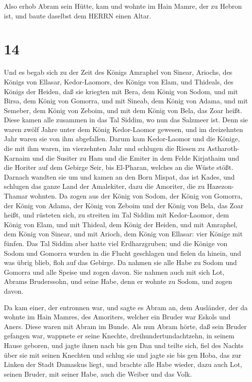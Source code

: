  Also erhob Abram sein Hütte, kam und wohnte im Hain Mamre,
der zu Hebron ist, und baute daselbst dem HERRN einen Altar.

\hypertarget{section-13}{%
\section{14}\label{section-13}}

 Und es begab sich zu der Zeit des Königs Amraphel von
Sinear, Ariochs, des Königs von Ellasar, Kedor-Laomors, des Königs von
Elam, und Thideals, des Königs der Heiden,  daß sie kriegten
mit Bera, dem König von Sodom, und mit Birsa, dem König von Gomorra, und
mit Sineab, dem König von Adama, und mit Semeber, dem König von Zeboim,
und mit dem König von Bela, das Zoar heißt.  Diese kamen
alle zusammen in das Tal Siddim, wo nun das Salzmeer ist. 
Denn sie waren zwölf Jahre unter dem König Kedor-Laomor gewesen, und im
dreizehnten Jahr waren sie von ihm abgefallen.  Darum kam
Kedor-Laomor und die Könige, die mit ihm waren, im vierzehnten Jahr und
schlugen die Riesen zu Astharoth-Karnaim und die Susiter zu Ham und die
Emiter in dem Felde Kirjathaim  und die Horiter auf dem
Gebirge Seir, bis El-Pharan, welches an die Wüste stößt. 
Darnach wandten sie um und kamen an den Born Mispat, das ist Kades, und
schlugen das ganze Land der Amalekiter, dazu die Amoriter, die zu
Hazezon-Thamar wohnten.  Da zogen aus der König von Sodom,
der König von Gomorra, der König von Adama, der König von Zeboim und der
König von Bela, das Zoar heißt, und rüsteten sich, zu streiten im Tal
Siddim  mit Kedor-Laomor, dem König von Elam, und mit
Thideal, dem König der Heiden, und mit Amraphel, dem König von Sinear,
und mit Arioch, dem König von Ellasar: vier Könige mit fünfen.
 Das Tal Siddim aber hatte viel Erdharzgruben; und die
Könige von Sodom und Gomorra wurden in die Flucht geschlagen und fielen
da hinein, und was übrig blieb, floh auf das Gebirge.  Da
nahmen sie alle Habe zu Sodom und Gomorra und alle Speise und zogen
davon.  Sie nahmen auch mit sich Lot, Abrams Bruderssohn,
und seine Habe, denn er wohnte zu Sodom, und zogen davon.

 Da kam einer, der entronnen war, und sagte es Abram an,
dem Ausländer, der da wohnte im Hain Mamres, des Amoriters, welcher ein
Bruder war Eskols und Aners. Diese waren mit Abram im Bunde.
 Als nun Abram hörte, daß sein Bruder gefangen war,
wappnete er seine Knechte, dreihundertundachtzehn, in seinem Hause
geboren, und jagte ihnen nach bis gen Dan  und teilte sich,
fiel des Nachts über sie mit seinen Knechten und schlug sie und jagte
sie bis gen Hoba, das zur Linken der Stadt Damaskus liegt, 
und brachte alle Habe wieder, dazu auch Lot, seinen Bruder, mit seiner
Habe, auch die Weiber und das Volk.

